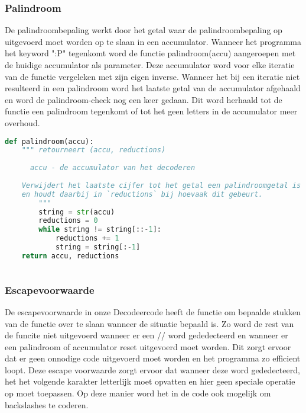 \documentclass{article}
\begin{document}
    \subsubsection{Palindroom}
    De palindroombepaling werkt door het getal waar de palindroombepaling op uitgevoerd moet worden op te slaan in een accumulator. Wanneer het programma het keyword ":P" tegenkomt word de functie palindroom(accu) aangeroepen met de huidige accumulator als parameter. Deze accumulator word voor elke iteratie van de functie vergeleken met zijn eigen inverse. Wanneer het bij een iteratie niet resulteerd in een palindroom word het laatste getal van de accumulator afgehaald en word de palindroom-check nog een keer gedaan. Dit word herhaald tot de functie een palindroom tegenkomt of tot het geen letters in de accumulator meer overhoud.
    \begin{lstlisting}[frame=single, language=python]
    def palindroom(accu):
    """ retourneert (accu, reductions)
    
      accu - de accumulator van het decoderen
    
    Verwijdert het laatste cijfer tot het getal een palindroomgetal is
    en houdt daarbij in `reductions` bij hoevaak dit gebeurt.
        """
        string = str(accu)
        reductions = 0
        while string != string[::-1]:
            reductions += 1
            string = string[:-1]
    return accu, reductions
    
    \end{lstlisting}
        
    \subsubsection{Escapevoorwaarde}
    De escapevoorwaarde in onze Decodeercode heeft de functie om bepaalde stukken van de functie over te slaan wanneer de situatie bepaald is. Zo word de rest van de funcite niet uitgevoerd wanneer er een // word gededecteerd en wanneer er een palindroom of accumulator reset uitgevoerd moet worden. Dit zorgt ervoor dat er geen onnodige code uitgevoerd moet worden en het programma zo efficient loopt. Deze escape voorwaarde zorgt ervoor dat wanneer deze word gededecteerd, het het volgende karakter letterlijk moet opvatten en hier geen speciale operatie op moet toepassen. Op deze manier word het in de code ook mogelijk om backslashes te coderen.
    
\end{document}
